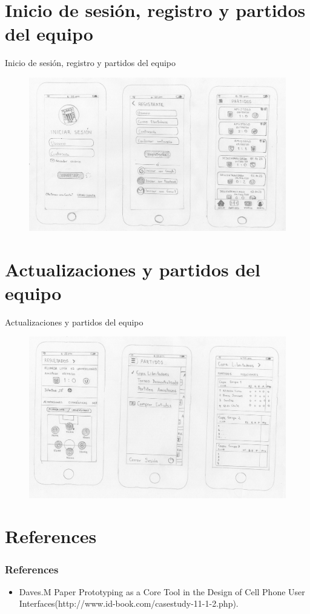 \documentclass[11pt]{beamer}
\begin{document}
\section{Inicio de sesión, registro y partidos del equipo}
\begin{frame}{Inicio de sesión, registro y partidos del equipo}
\begin{figure}
    \centering
    \includegraphics[width=\linewidth]{ihc002.jpg}
\end{figure}
\end{frame}
\section{Actualizaciones y partidos del equipo}
\begin{frame}{Actualizaciones y partidos del equipo}
\begin{figure}
  \centering
  \includegraphics[width=\linewidth]{ihc003.jpg}
\end{figure}
\end{frame}

\section{References}
\begin{frame}
\frametitle{References}
\begin{itemize}
\item Daves.M Paper Prototyping as a Core Tool in the Design of Cell Phone User Interfaces(http://www.id-book.com/casestudy-11-1-2.php).
\end{itemize}
\end{frame}
\end{document}
